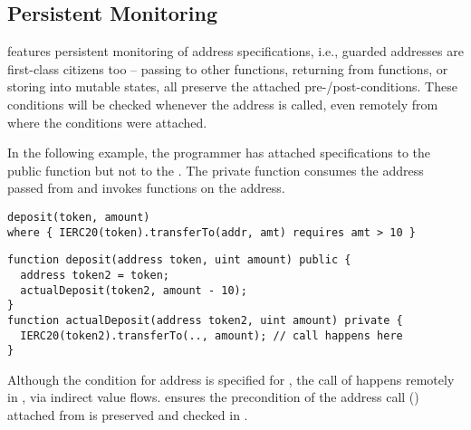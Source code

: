 \subsection{\textbf{Persistent Monitoring}}
\label{sec:examples-monitoring}
\lang features persistent monitoring of address specifications,
i.e., guarded addresses are first-class citizens too -- passing
to other functions, returning from functions, or storing into mutable states, 
all preserve the attached pre-/post-conditions.
These conditions will be checked whenever the address is called, even remotely 
from where the conditions were attached.


In the following example, the programmer has attached specifications
to the public function  but not to the .
The private function  consumes the address passed
from  and invokes functions on the address.
\begin{lstlisting}[language=Consol]
deposit(token, amount) 
where { IERC20(token).transferTo(addr, amt) requires amt > 10 }
\end{lstlisting}
\vspace{-0.25em}
\begin{lstlisting}[language=Solidity]
function deposit(address token, uint amount) public {
  address token2 = token;
  actualDeposit(token2, amount - 10);
}
function actualDeposit(address token2, uint amount) private {
  IERC20(token2).transferTo(.., amount); // call happens here
}
\end{lstlisting}
Although the condition for address  is specified for ,
the call of  happens remotely in ,
via indirect value flows.
\lang ensures the precondition of the address call () 
attached from   is preserved and checked in .

